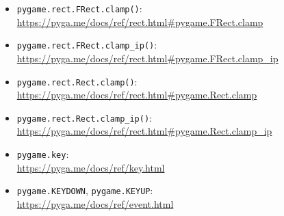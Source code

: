 \begin{itemize}
  \item \texttt{pygame.rect.FRect.clamp()}:
  \\
   \url{https://pyga.me/docs/ref/rect.html#pygame.FRect.clamp}

  \item \texttt{pygame.rect.FRect.clamp\_ip()}:
  \\
  \url{https://pyga.me/docs/ref/rect.html#pygame.FRect.clamp_ip}

  \item \texttt{pygame.rect.Rect.clamp()}:
  \\
  \url{https://pyga.me/docs/ref/rect.html#pygame.Rect.clamp}

\item \texttt{pygame.rect.Rect.clamp\_ip()}:
\\
\url{https://pyga.me/docs/ref/rect.html#pygame.Rect.clamp_ip}

	\item \texttt{pygame.key}:
	\\ \url{https://pyga.me/docs/ref/key.html}

	\item \texttt{pygame.KEYDOWN}, \texttt{pygame.KEYUP}:
	\\ \url{https://pyga.me/docs/ref/event.html}
	
\end{itemize}

